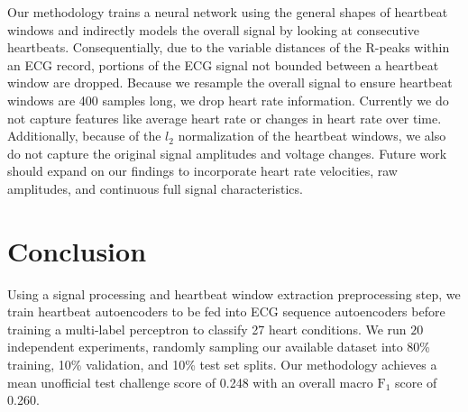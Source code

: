 \documentclass[\main/thesis.tex]{subfiles}
\begin{document}
Our methodology trains a neural network using the general shapes of heartbeat windows and indirectly models the overall signal by looking at consecutive heartbeats.
Consequentially, due to the variable distances of the R-peaks within an ECG record, portions of the ECG signal not bounded between a heartbeat window are dropped.
Because we resample the overall signal to ensure heartbeat windows are 400 samples long, we drop heart rate information.
Currently we do not capture features like average heart rate or changes in heart rate over time.
Additionally, because of the $l_2$ normalization of the heartbeat windows, we also do not capture the original signal amplitudes and voltage changes.
Future work should expand on our findings to incorporate heart rate velocities, raw amplitudes, and continuous full signal characteristics.

\section{Conclusion}

Using a signal processing and heartbeat window extraction preprocessing step, we train heartbeat autoencoders to be fed into ECG sequence autoencoders before training a multi-label perceptron to classify 27 heart conditions.
We run $20$ independent experiments, randomly sampling our available dataset into 80\% training, 10\% validation, and 10\% test set splits.
Our methodology achieves a mean unofficial test challenge score of 0.248 with an overall macro $\text{F}_1$ score of 0.260.
    
\end{document}
